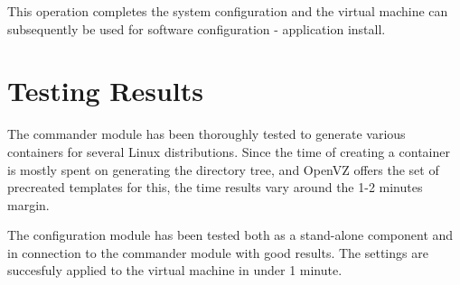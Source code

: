 This operation completes the system configuration and the virtual machine can 
subsequently be used for software configuration - application install.

\section{Testing Results} \label{sec:openvz-testing}
The commander module has been thoroughly tested to generate various containers 
for several Linux distributions. Since the time of creating a container is 
mostly spent on generating the directory tree, and OpenVZ offers the set of 
precreated templates for this, the time results vary around the 1-2 minutes margin.

The configuration module has been tested both as a stand-alone component and 
in connection to the commander module with good results. The settings are 
succesfuly applied to the virtual machine in under 1 minute.